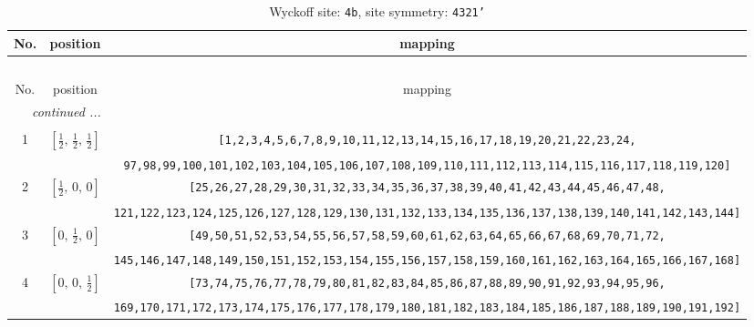 \documentclass[fleqn,8pt]{jsarticle}
\begin{document}
\begin{longtable}{ccc}
\caption{Wyckoff site: {\tt 4b}, site symmetry: {\tt 4321'}}
 \\
 \hline \hline
No. & position & mapping \\ \hline \endfirsthead

\multicolumn{2}{l}{\tablename\ \thetable{}} \\
 \hline \hline
No. & position & mapping \\ \hline \endhead

 \hline \hline
\multicolumn{2}{r}{\footnotesize\it continued ...} \\ \endfoot

 \hline \hline
\multicolumn{2}{r}{} \\ \endlastfoot

1 & $\left[ \frac{1}{2},\, \frac{1}{2},\, \frac{1}{2} \right]$ & {\tt [1,2,3,4,5,6,7,8,9,10,11,12,13,14,15,16,17,18,19,20,21,22,23,24,} \\ \hline
 &  & {\tt 97,98,99,100,101,102,103,104,105,106,107,108,109,110,111,112,113,114,115,116,117,118,119,120]} \\ \hline
2 & $\left[ \frac{1}{2},\, 0,\, 0 \right]$ & {\tt [25,26,27,28,29,30,31,32,33,34,35,36,37,38,39,40,41,42,43,44,45,46,47,48,} \\ \hline
 &  & {\tt 121,122,123,124,125,126,127,128,129,130,131,132,133,134,135,136,137,138,139,140,141,142,143,144]} \\ \hline
3 & $\left[ 0,\, \frac{1}{2},\, 0 \right]$ & {\tt [49,50,51,52,53,54,55,56,57,58,59,60,61,62,63,64,65,66,67,68,69,70,71,72,} \\ \hline
 &  & {\tt 145,146,147,148,149,150,151,152,153,154,155,156,157,158,159,160,161,162,163,164,165,166,167,168]} \\ \hline
4 & $\left[ 0,\, 0,\, \frac{1}{2} \right]$ & {\tt [73,74,75,76,77,78,79,80,81,82,83,84,85,86,87,88,89,90,91,92,93,94,95,96,} \\ \hline
 &  & {\tt 169,170,171,172,173,174,175,176,177,178,179,180,181,182,183,184,185,186,187,188,189,190,191,192]} \\
\end{longtable}
\renewcommand{\arraystretch}{1.2}
\end{document}
